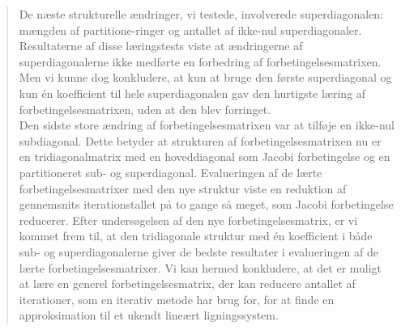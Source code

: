 \begin{abstract}
De næste strukturelle ændringer, vi testede, involverede superdiagonalen: mængden af partitione-ringer og antallet af ikke-nul superdiagonaler. Resultaterne af disse læringstests viste at ændringerne af superdiagonalerne ikke medførte en forbedring af forbetingelsesmatrixen. Men vi kunne dog konkludere, at kun at bruge den første superdiagonal og kun én koefficient til hele superdiagonalen gav den hurtigste læring af forbetingelsesmatrixen, uden at den blev forringet.
\\

Den sidste store ændring af forbetingelsesmatrixen var at tilføje en ikke-nul subdiagonal. Dette betyder at strukturen af forbetingelsesmatrixen nu er en tridiagonalmatrix med en hoveddiagonal som Jacobi forbetingelse og en partitioneret sub- og superdiagonal. Evalueringen af de lærte forbetingelsesmatrixer med den nye struktur viste en reduktion af gennemsnits iterationstallet på to gange så meget, som Jacobi forbetingelse reducerer. Efter undersøgelsen af den nye forbetingelsesmatrix, er vi kommet frem til, at den tridiagonale struktur med én koefficient i både sub- og superdiagonalerne giver de bedste resultater i evalueringen af de lærte forbetingelsesmatrixer. Vi kan hermed konkludere, at det er muligt at lære en generel forbetingelsesmatrix, der kan reducere antallet af iterationer, som en iterativ metode har brug for, for at finde en approksimation til et ukendt lineært ligningssystem. 
\end{abstract}
\clearpage


